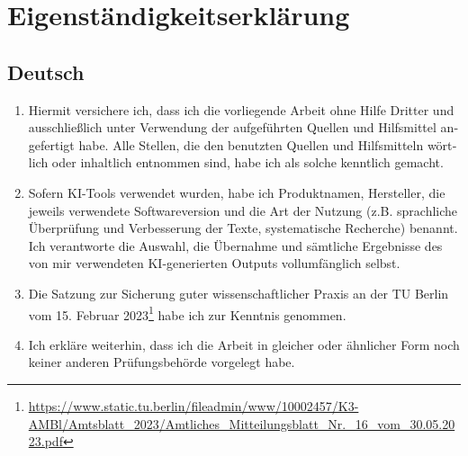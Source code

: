\chapter*{Eigenst\"andigkeitserkl\"arung}
\begin{otherlanguage}{ngerman}
\section*{Deutsch}
\begin{enumerate}[noitemsep]
\item Hiermit versichere ich, dass ich die vorliegende Arbeit ohne Hilfe Dritter und ausschlie\ss lich unter Verwendung der aufgef\"uhrten Quellen und Hilfsmittel angefertigt habe. Alle Stellen, die den benutzten Quellen und Hilfsmitteln w\"ortlich oder inhaltlich entnommen sind, habe ich als solche kenntlich gemacht.
\item Sofern KI-Tools verwendet wurden, habe ich Produktnamen, Hersteller, die jeweils verwendete Softwareversion und die Art der Nutzung (z.B. sprachliche \"Uberpr\"ufung und Verbesserung der Texte, systematische Recherche) benannt. Ich verantworte die Auswahl, die \"Ubernahme und s\"amtliche Ergebnisse des von mir verwendeten KI-generierten Outputs vollumf\"anglich selbst.
\item Die Satzung zur Sicherung guter wissenschaftlicher Praxis an der TU Berlin vom 15. Februar 2023\footnote{\url{https://www.static.tu.berlin/fileadmin/www/10002457/K3-AMBl/Amtsblatt_2023/Amtliches_Mitteilungsblatt_Nr._16_vom_30.05.2023.pdf}} habe ich zur Kenntnis genommen.
\item Ich erkl\"are weiterhin, dass ich die Arbeit in gleicher oder \"ahnlicher Form noch keiner anderen Pr\"ufungsbeh\"orde vorgelegt habe.
\end{enumerate}
\end{otherlanguage}
